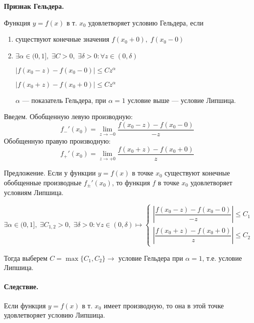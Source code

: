 \textbf{Признак Гельдера.}
\begin{greyDefinition} Функция $ y = f(x) $  в т. $ x_0 $ удовлетворяет условию Гельдера, если
 \begin{enumerate}
	\item существуют конечные значения $ f(x_0+0),\; f(x_0-0) $
	\item $ \exists \alpha \in (0,1],\; \exists C>0,\; \exists \delta> 0: \forall z \in (0,\delta) $
	
	$| f(x_0-z) - f(x_0-0) | \leqslant  Cz^\alpha$
	
	$ |f(x_0+z) - f(x_0+0) | \leqslant Cz^\alpha$
	
	$ \alpha $ --- показатель Гельдера, при $ \alpha=1 $ условие выше --- условие Липшица.
\end{enumerate}
\end{greyDefinition}
\begin{greySmth}{Введем.}
	Обобщенную левую производную:
$$f_-'(x_0) = \lim\limits_{z \rightarrow -0}\dfrac{f(x_0-z) - f(x_0-0)}{-z} $$
Обобщенную правую производную:
$$f_+'(x_0) = \lim\limits_{z \rightarrow +0} \dfrac{f(x_0+z)-f(x_0+0)}{z} $$
\end{greySmth}
\begin{greySmth}{Предложение.}
	Если у функции $ y=f(x) $ в точке $ x_0 $ существуют конечные обобщенные производные $ f_\pm'(x_0) $, то функция $ f $ в точке $ x_0 $ удовлетворяет условиям Липшица.
\end{greySmth}
\begin{greyProof}
	$ \exists \alpha \in (0,1],\; \exists C_{1,2}>0,\; \exists \delta> 0: \forall z \in (0,\delta) \mapsto
	\begin{cases}
	  \left| \dfrac{f(x_0-z)-f(x_0-0)}{-z}  \right| \leqslant C_1\\[0.9em]
	
	 \left| \dfrac{f(x_0+z)-f(x_0+0)}{z}  \right| \leqslant C_2
	 \end{cases}$
	 
	Тогда выберем $C = \max\{C_1,C_2\} \rightarrow$ условие Гельдера при $ \alpha = 1 $, т.е. условие \mbox{Липшица}.
\end{greyProof}
\paragraph{Следствие.} Если функция $ y=f(x) $ в т. $ x_0 $ имеет производную, то она в этой точке удовлетворяет условию Липшица.
